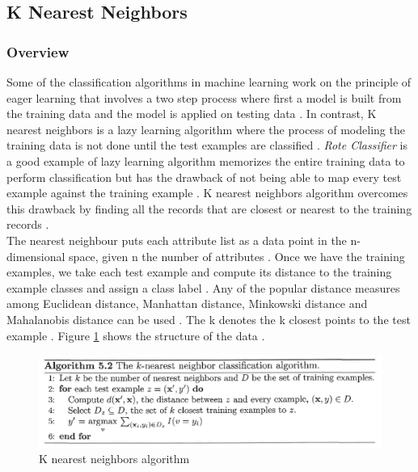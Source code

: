 \documentclass[sigconf]{acmart}
\begin{document}
\subsection{K Nearest Neighbors}

\subsubsection{Overview} Some of the classification algorithms in machine learning work on the principle of eager learning that involves a two step process where first a model is built from the training data and the model is applied on testing data \cite{book-tan}. In contrast, K nearest neighbors is a lazy learning algorithm where the process of modeling the training data is not done until the test examples are classified \cite{book-tan}. {\em Rote Classifier} is a good example of lazy learning algorithm memorizes the entire training data to perform classification but has the drawback of not being able to map every test example against the training example \cite{book-tan}. K nearest neighbors algorithm overcomes this drawback by finding all the records that are closest or nearest to the training records \cite{book-tan}. \\

The nearest neighbour puts each attribute list as a data point in the n-dimensional space, given n the number of attributes \cite{book-tan}. Once we have the training examples, we take each test example and compute its distance to the training example classes and assign a class label \cite{book-tan}. Any of the popular distance measures among Euclidean distance, Manhattan distance, Minkowski distance and Mahalanobis distance can be used \cite{book-tan}. The k denotes the k closest points to the test example \cite{book-tan}. Figure \ref{fig:Fig1} shows the structure of the data \cite{book-tan}.

\begin{figure}
\includegraphics[width=1.0\columnwidth]{images/fig1.png}
\caption{K nearest neighbors algorithm\cite{book-tan}}
\label{fig:Fig1}
\end{figure}
\end{document}
